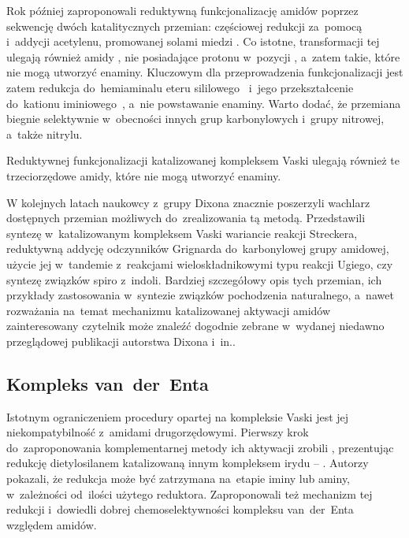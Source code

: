 Rok później \citeauthor{huang16c} zaproponowali reduktywną funkcjonalizację amidów poprzez
  sekwencję dwóch katalitycznych przemian: częściowej redukcji za~pomocą \vaska{} i~addycji
  acetylenu, promowanej solami miedzi .
Co istotne, transformacji tej ulegają również amidy , nie posiadające
  protonu w~pozycji \textalpha{}, a~zatem takie, które nie mogą utworzyć enaminy.
Kluczowym dla przeprowadzenia funkcjonalizacji jest zatem redukcja do~hemiaminalu eteru
  sililowego~ i~jego przekształcenie do~kationu iminiowego~,
  a~nie powstawanie enaminy.
Warto dodać, że przemiana biegnie selektywnie w~obecności innych grup karbonylowych i~grupy
  nitrowej, a~także nitrylu.
\begin{scheme*}
  
  \caption{
    Reduktywnej funkcjonalizacji katalizowanej kompleksem Vaski ulegają również te trzeciorzędowe
      amidy, które nie mogą utworzyć enaminy.
  }
  \label{sch:ir-cu-activation}
\end{scheme*}

W kolejnych latach naukowcy z~grupy Dixona znacznie poszerzyli wachlarz dostępnych przemian
  możliwych do~zrealizowania tą metodą.
Przedstawili syntezę  w~katalizowanym kompleksem Vaski wariancie reakcji
  Streckera,
  reduktywną addycję odczynników Grignarda do~karbonylowej grupy amidowej,
  użycie jej w~tandemie z~reakcjami wieloskładnikowymi typu reakcji Ugiego,
  czy syntezę związków spiro z~indoli.
Bardziej szczegółowy opis tych przemian, ich przykłady zastosowania w~syntezie związków pochodzenia
  naturalnego, a~nawet rozważania na~temat mechanizmu katalizowanej \vaska{} aktywacji amidów
  zainteresowany czytelnik może znaleźć dogodnie zebrane w~wydanej niedawno przeglądowej
  publikacji autorstwa Dixona i~in..

\subsection{Kompleks van~der~Enta}\label{literature:new:van-der-ent}
Istotnym ograniczeniem procedury opartej na kompleksie Vaski jest jej niekompatybilność z~amidami
  drugorzędowymi.
Pierwszy krok do~zaproponowania komplementarnej metody ich aktywacji zrobili \citeauthor{cheng12},
  prezentując redukcję dietylosilanem katalizowaną innym kompleksem irydu \---
  .
Autorzy pokazali, że redukcja może być zatrzymana na~etapie iminy lub aminy, w~zależności
  od~ilości użytego reduktora.
Zaproponowali też mechanizm tej redukcji i~dowiedli dobrej chemoselektywności kompleksu
  van~der~Enta względem amidów.

